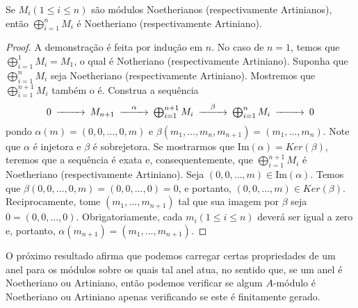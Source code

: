 \begin{corollary}
	\label{loc:6.3_:_relação_da_acc_e_dcc_com_sequências_exatas.corolário_6.4}
	Se $M_{i} (1\leq i\leq n)$ são módulos Noetherianos (respectivamente Artinianos), então $\bigoplus_{i=1}^{n}M_{i}$ é Noetheriano (respectivamente Artiniano).
	\begin{proof}

		A demonstração é feita por indução em $n$. No caso de $n=1$, temos que $\bigoplus_{i=1}^{1}M_{i}=M_{1}$, o qual é Notheriano (respectivamente Artiniano).
		Suponha que $\bigoplus_{i=1}^{n}M_{i}$ seja Noetheriano (respectivamente Artiniano). Mostremos que $\bigoplus_{i=1}^{n+1}M_{i}$ também o é.
		Construa a sequência
		\begin{equation*}
			\begin{CD}
				0@>{}>> M_{n+1}@>{\alpha}>>\bigoplus_{i=1}^{n+1}M_{i} @>{\beta}>>\bigoplus_{i=1}^{n}M_{i}@>{}>>0
			\end{CD}
		\end{equation*}
		pondo $\alpha(m)=(0, 0, \dots, 0, m)$ e $\beta(m_{1}, \dots,m_{n}, m_{n+1})=(m_{1}, \dots, m_{n})$.
		Note que $\alpha$ é injetora e $\beta$ é sobrejetora.
		Se mostrarmos que $\mathrm{Im}(\alpha)=Ker(\beta)$, teremos que a sequência é exata e, consequentemente, que $\bigoplus_{i=1}^{n+1}M_{i}$ é Noetheriano (respectivamente Artiniano).
		Seja $(0, 0, \dots, m) \in \mathrm{Im}(\alpha)$. Temos que $\beta(0, 0, \dots, 0, m)=(0, 0, \dots, 0)= 0$, e portanto, $(0, 0, \dots, m) \in Ker(\beta)$. Reciprocamente, tome $(m_{1}, \dots, m_{n+1})$ tal que sua imagem por $\beta$ seja $0 = (0, 0, \dots, 0)$. Obrigatoriamente, cada $m_{i}(1\leq i\leq n)$ deverá ser igual a zero e, portanto, $\alpha(m_{n+1})=(m_{1}, \dots, m_{n+1})$.
	\end{proof}
\end{corollary}
O próximo resultado afirma que podemos carregar certas propriedades de um anel para os módulos sobre os quais tal anel atua, no sentido que, se um anel é Noetheriano ou Artiniano, então podemos verificar se algum $A$-módulo é Noetheriano ou Artiniano apenas verificando se este é finitamente gerado.
